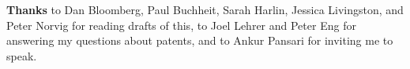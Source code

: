 \textbf{Thanks} to Dan Bloomberg, Paul
                  Buchheit, Sarah Harlin, Jessica Livingston, and Peter Norvig
                  for reading drafts of this, to Joel Lehrer and Peter Eng for
                  answering my questions about patents, and to Ankur Pansari for
                  inviting me to speak.


              
            
          
